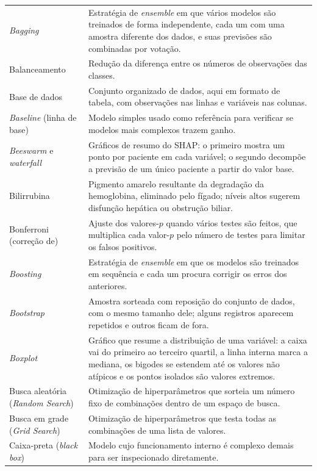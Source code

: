 \begin{longtable}{@{}p{3.8cm}p{10.7cm}@{}}
\textit{Bagging} & Estratégia de \textit{ensemble} em que vários modelos são treinados de forma independente, cada um com uma amostra diferente dos dados, e suas previsões são combinadas por votação. \\[0.15cm]
Balanceamento & Redução da diferença entre os números de observações das classes. \\[0.15cm]
Base de dados & Conjunto organizado de dados, aqui em formato de tabela, com observações nas linhas e variáveis nas colunas. \\[0.15cm]
\textit{Baseline} (linha de base) & Modelo simples usado como referência para verificar se modelos mais complexos trazem ganho. \\[0.15cm]
\textit{Beeswarm} e \textit{waterfall} & Gráficos de resumo do SHAP: o primeiro mostra um ponto por paciente em cada variável; o segundo decompõe a previsão de um único paciente a partir do valor base. \\[0.15cm]
Bilirrubina & Pigmento amarelo resultante da degradação da hemoglobina, eliminado pelo fígado; níveis altos sugerem disfunção hepática ou obstrução biliar. \\[0.15cm]
Bonferroni (correção de) & Ajuste dos valores-$p$ quando vários testes são feitos, que multiplica cada valor-$p$ pelo número de testes para limitar os falsos positivos. \\[0.15cm]
\textit{Boosting} & Estratégia de \textit{ensemble} em que os modelos são treinados em sequência e cada um procura corrigir os erros dos anteriores. \\[0.15cm]
\textit{Bootstrap} & Amostra sorteada com reposição do conjunto de dados, com o mesmo tamanho dele; alguns registros aparecem repetidos e outros ficam de fora. \\[0.15cm]
\textit{Boxplot} & Gráfico que resume a distribuição de uma variável: a caixa vai do primeiro ao terceiro quartil, a linha interna marca a mediana, os bigodes se estendem até os valores não atípicos e os pontos isolados são valores extremos. \\[0.15cm]
Busca aleatória (\textit{Random Search}) & Otimização de hiperparâmetros que sorteia um número fixo de combinações dentro de um espaço de busca. \\[0.15cm]
Busca em grade (\textit{Grid Search}) & Otimização de hiperparâmetros que testa todas as combinações de uma lista de valores. \\[0.15cm]
Caixa-preta (\textit{black box}) & Modelo cujo funcionamento interno é complexo demais para ser inspecionado diretamente. \\[0.15cm]

\end{longtable}
